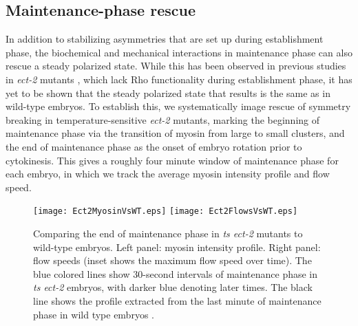 \documentclass[11pt]{article}
\newcommand{\6}[1]{#1_{\text{6}}}
\newcommand{\3}[1]{#1_{\text{3}}}
\begin{document}
\subsection{Maintenance-phase rescue}
In addition to stabilizing asymmetries that are set up during establishment phase, the biochemical and mechanical interactions in maintenance phase can also rescue a steady polarized state. While this has been observed in previous studies  in \emph{ect-2} mutants \cite{zonies2010symmetry, tse2012rhoa}, which lack Rho functionality during establishment phase, it has yet to be shown that the steady polarized state that results is the same as in wild-type embryos. To establish this, we systematically image rescue of symmetry breaking in temperature-sensitive \emph{ect-2} mutants, marking the beginning of maintenance phase via the transition of myosin from large to small clusters, and the end of maintenance phase as the onset of embryo rotation prior to cytokinesis. This gives a roughly four minute window of maintenance phase for each embryo, in which we track the average myosin intensity profile and flow speed.

\begin{figure}
\centering
\texttt{[image: Ect2MyosinVsWT.eps]}
\texttt{[image: Ect2FlowsVsWT.eps]}
\caption{\label{fig:Ect2VsWT} Comparing the end of maintenance phase in \emph{ts ect-2} mutants to wild-type embryos. Left panel: myosin intensity profile. Right panel: flow speeds (inset shows the maximum flow speed over time). The blue colored lines show 30-second intervals of maintenance phase in \emph{ts ect-2} embryos, with darker blue denoting later times. The black line shows the profile extracted from the last minute of maintenance phase in wild type embryos \cite{sailer2015dynamic}.}
\end{figure}
\end{document}
